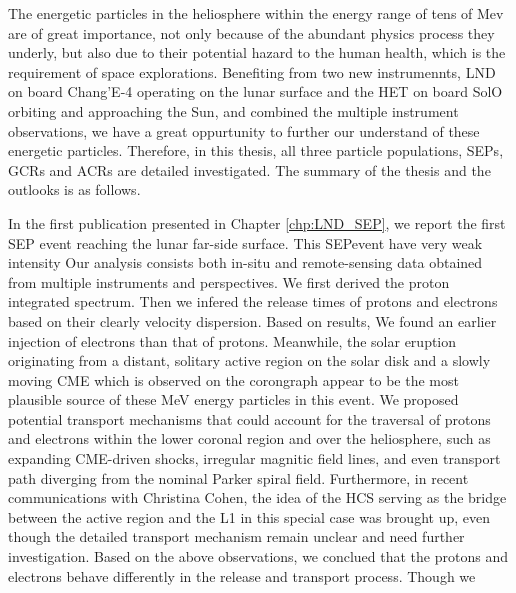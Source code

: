 The energetic particles in the heliosphere within the energy range of tens of Mev are of great importance, not only because of the abundant physics process they underly, but also due to their potential hazard to the human health, which is the requirement of space explorations.
Benefiting from two new instrumennts, \ac{LND} on board Chang'E-4 operating on the lunar surface and the \ac{HET} on board \ac{SolO} orbiting and approaching the Sun, and combined the multiple instrument observations,  we have a great oppurtunity to further our understand of these energetic particles.
Therefore, in this thesis, all three particle populations, \acp{SEP}, \acp{GCR} and \acp{ACR} are detailed investigated. The summary of the thesis and the outlooks is as follows.



In the first publication presented in Chapter \ref{chp:LND_SEP}, we report the first \ac{SEP} event reaching the lunar far-side surface. This \ac{SEP}event have very weak intensity 
Our analysis consists both in-situ and remote-sensing data obtained from multiple instruments and perspectives. We first derived the proton integrated spectrum. Then we infered the release times of protons and electrons based on their clearly velocity dispersion. Based on results, We found an earlier injection of electrons than that of protons. 
Meanwhile, the solar eruption originating from a distant, solitary active region on the solar disk and a slowly moving \ac{CME} which is observed on the corongraph appear to be the most plausible source of these MeV energy particles in this event. We proposed potential transport mechanisms that could account for the traversal of protons and electrons within the lower coronal region and over the heliosphere, such as expanding \ac{CME}-driven shocks, irregular magnitic field lines, and even transport path diverging from the nominal Parker spiral field. Furthermore, in recent communications with Christina Cohen, the idea of the \ac{HCS} serving as the bridge between the active region and the \ac{L1} in this special case was brought up, even though the detailed transport mechanism remain unclear and need further investigation. Based on the above observations, we conclued that the protons and electrons behave differently in the release and transport process. Though we 

